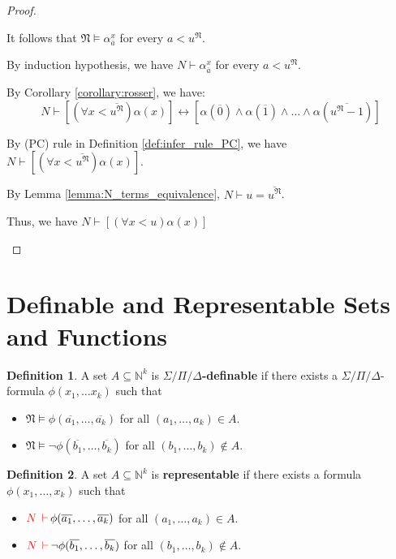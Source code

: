 \documentclass[11pt,letterpaper]{book}
\theoremstyle{definition}
\newtheorem{definition}{Definition}[section]
\begin{document}
\begin{proof}
\begin{itemize}
{It follows that $\mathfrak{N} \models \alpha_{\overline{a}} ^x$ for every $a < u^{\mathfrak{N}}$.

By induction hypothesis, we have $N \vdash \alpha_{\overline{a}} ^x$ for every $a < u^{\mathfrak{N}}$.

By Corollary \ref{corollary:rosser}, we have:
$$  N \vdash [(\forall x < \overline{u^{\mathfrak{N}}})
\alpha(x)] \leftrightarrow [ \alpha(\overline{0}) \land \alpha( \overline{1} )
\land \ldots \land \alpha( \overline{u^{\mathfrak{N}} - 1} ) ] $$

By (PC) rule in Definition \ref{def:infer_rule_PC}, we have $N \vdash [(\forall x < \overline{u^{\mathfrak{N}}})
\alpha(x)]$.

By Lemma \ref{lemma:N_terms_equivalence}, $N \vdash u = \overline{u^{\mathfrak{N}}}$.

Thus, we have $N \vdash [(\forall x < u)
\alpha(x)]$

}
\end{itemize}
\end{proof}

\section{Definable and Representable Sets and Functions}

\begin{definition}
\label{def:definable_set}
A set $A \subseteq \mathbb{N}^k$ is \textbf{$\Sigma / \Pi / \Delta$-definable} if there exists a $\Sigma / \Pi / \Delta$-formula $\phi (x_1, \ldots x_k)$ such that
\begin{itemize}
\item{$\mathfrak{N} \models \phi (\overline{a_1}, \ldots, \overline{a_k})$ for all $ (a_1, \ldots, a_k) \in A $.}
\item{$\mathfrak{N} \models \lnot \phi (\overline{b_1}, \ldots, \overline{b_k})$ for all $ (b_1, \ldots, b_k) \not \in A $.}
\end{itemize}
\end{definition}

\begin{definition}
\label{def:representable_set}
A set $A \subseteq \mathbb{N}^k$ is \textbf{representable} if there exists a formula $\phi(x_1, \ldots, x_k)$ such that
\begin{itemize}
\item{${\color{red} N \,  \vdash} \, \phi(\overline{a_1}, \ldots, \overline{a_k})$ for all $(a_1, \ldots, a_k) \in A $.}
\item{${\color{red} N \,  \vdash} \, \lnot \phi (\overline{b_1}, \ldots, \overline{b_k})$ for all $ (b_1, \ldots, b_k) \not \in A $.}
\end{itemize}

\end{definition}
\end{document}
